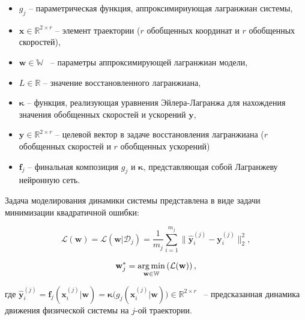 \documentclass[12pt, twoside]{article}
\begin{document}
        \begin{itemize}

            \item[] $g_j$ -- параметрическая функция, аппроксимириующая лагранжиан системы,

            \item[] $\mathbf{x} \in \mathbb{R}^{2 \times r}$ --  элемент траектории ($r$ обобщенных координат и $r$ обобщенных скоростей),

            \item[] $\mathbf{w} \in \mathbb{W}$ ~-- параметры аппроксимирующей лагранжиан модели,

            \item[] $L \in \mathbb{R}$ -- значение восстановленного лагранжиана,

            \item[] $\mathbf{\kappa}$ -- функция, реализующая уравнения Эйлера-Лагранжа для нахождения значения обобщенных скоростей и ускорений $\mathbf{y}$,

            \item[] $\mathbf{y} \in \mathbb{R}^{2 \times r}$ -- целевой вектор в задаче восстановления лагранжиана ($r$ обобщенных скоростей и $r$ обобщенных ускорений)

            \item[] $\mathbf{f}_j$ -- финальная композиция $g_j$ и $\mathbf{\kappa}$, представляющая собой Лагранжеву нейронную сеть.
            
        
        \end{itemize}

\newpage

        Задача моделирования динамики системы представлена в виде задачи минимизации квадратичной ошибки: 

        

        $$\mathcal{L}(\textbf{w}) = \mathcal{L}(\mathbf{w} | \mathcal{D}_j) = \frac{1}{m_j}\sum_{i=1}^{m_j} \| \hat{\mathbf{y}}_i^{(j)} - \mathbf{y}_i^{(j)} \|_2^2,$$

        
    
        $$\textbf{w}_j^* = \argmin_{\mathbf{w} \in \mathbb{W}} \left( \mathcal{L}(\textbf{w}) \right),$$

        \noindent
        где $\hat{\mathbf{y}}_i^{(j)} = \mathbf{f}_j (\mathbf{x}_i^{(j)} | \mathbf{w}) = \mathbf{\kappa} \big( g_j (\mathbf{x}_i^{(j)} | \mathbf{w}) \big) \in \mathbb{R}^{2 \times r}$ ~-- предсказанная динамика движения физической системы на $j$-ой траектории.
    
\end{document}
